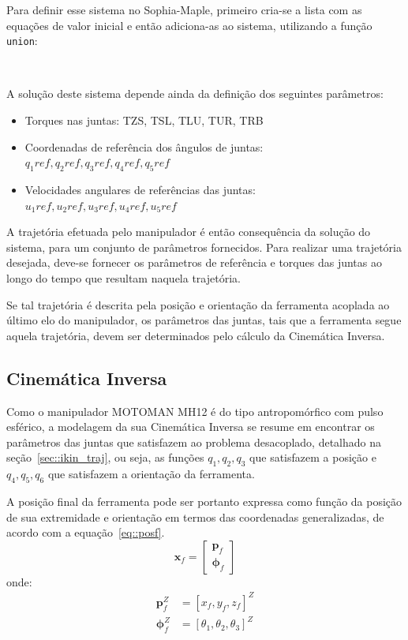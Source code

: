 Para definir esse sistema no Sophia-Maple, primeiro cria-se a lista com as
equações de valor inicial e então adiciona-as ao sistema, utilizando a função
\texttt{union}:

\medskip {} \\ 
		  \medskip

A solução deste sistema depende ainda da definição dos seguintes parâmetros:
%
\begin{itemize}
  \item{Torques nas juntas: TZS, TSL, TLU, TUR, TRB}
  \item{Coordenadas de referência dos ângulos de juntas: 
  		\\ $q_{1}ref, q_{2}ref, q_{3}ref, q_{4}ref, q_{5}ref$}
  \item{Velocidades angulares de referências das juntas: 
  		\\ $u_{1}ref, u_{2}ref, u_{3}ref, u_{4}ref, u_{5}ref$}
\end{itemize}
%
A trajetória efetuada pelo manipulador é então consequência da solução do
sistema, para um conjunto de parâmetros fornecidos. Para realizar uma trajetória
desejada, deve-se fornecer os parâmetros de referência e torques das juntas ao
longo do tempo que resultam naquela trajetória.

Se tal trajetória é descrita pela posição e orientação da ferramenta acoplada ao
último elo do manipulador, os parâmetros das juntas, tais que a ferramenta
segue aquela trajetória, devem ser determinados pelo cálculo da Cinemática
Inversa.


\subsection{Cinemática Inversa}\label{sec::ikin_mh12}

Como o manipulador MOTOMAN MH12 é do tipo antropomórfico com pulso esférico, a
modelagem da sua Cinemática Inversa se resume em encontrar os parâmetros das
juntas que satisfazem ao problema desacoplado, detalhado na
seção~\ref{sec::ikin_traj}, ou seja, as funções $q_{1}, q_{2}, q_{3}$ que
satisfazem a posição e $q_{4}, q_{5}, q_{6}$ que satisfazem a orientação da
ferramenta.

A posição final da ferramenta pode ser portanto expressa como função da posição
de sua extremidade e orientação em termos das coordenadas generalizadas, de
acordo com a equação~\ref{eq::posf}.
%
\begin{equation}
	\mathbf{x}_{f} = \begin{bmatrix}
		\mathbf{p}_{f} \\ \boldsymbol{\phi}_{f}
	\end{bmatrix}
	\label{eq::posf}	
\end{equation}
%
\noindent onde: 
%
\begin{align}
\mathbf{p}_{f}^Z &= [x_f,y_f,z_f]^Z \\
\boldsymbol{\phi}_{f}^Z &= [\theta_1,\theta_2,\theta_3]^Z
\end{align}
%

